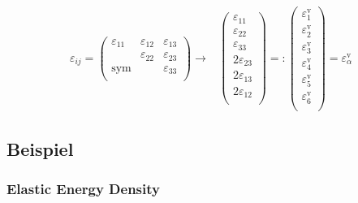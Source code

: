 \documentclass[a4paper]{scrartcl}
\begin{document}
 \begin{align} \varepsilon_{ij}= \begin{pmatrix} \varepsilon_{11} &
\varepsilon_{12} & \varepsilon_{13} \\ & \varepsilon_{22} & \varepsilon_{23} \\
\text{sym} & & \varepsilon_{33} \\ \end{pmatrix} \longrightarrow &
\begin{pmatrix} \varepsilon_{11} \\ \varepsilon_{22} \\ \varepsilon_{33} \\ 2 
\varepsilon_{23} \\ 2 \varepsilon_{13} \\ 2 \varepsilon_{12} \\ \end{pmatrix} =
: \begin{pmatrix} \varepsilon^{\text{v}}_{1} \\ \varepsilon^{\text{v}}_{2} \\
\varepsilon^{\text{v}}_{3} \\ \varepsilon^{\text{v}}_{4} \\
\varepsilon^{\text{v}}_{5} \\ \varepsilon^{\text{v}}_{6} \\ \end{pmatrix} = 
\varepsilon^{\text{v}}_\alpha \end{align}

\subsection{Beispiel}

\subsubsection{Elastic Energy Density} %
\end{document}
